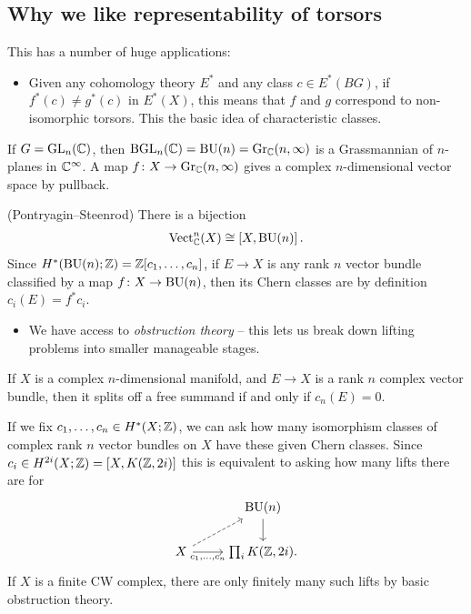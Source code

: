 \documentclass[11pt,openany]{book}
\begin{document}
\subsection{Why we like representability of torsors}





This has a number of huge applications:
\begin{itemize}
    \item Given any cohomology theory $E^\ast$ and any class $c\in E^\ast(BG)$, if $f^\ast(c) \ne g^\ast(c)$ in $E^\ast(X)$, this means that $f$ and $g$ correspond to non-isomorphic torsors. This the basic idea of characteristic classes.
\end{itemize}

\begin{example} If $G = \mathrm{GL}_n(\mathbb{C})$, then $\mathrm{BGL}_n(\mathbb{C}) = \mathrm{BU}(n) = \mathrm{Gr}_{\mathbb{C}}(n,\infty)$ is a Grassmannian of $n$-planes in $\mathbb{C}^\infty$. A map $f \colon X \to \mathrm{Gr}_{\mathbb{C}}(n,\infty)$ gives a complex $n$-dimensional vector space by pullback.
\end{example}

\begin{theorem} (Pontryagin--Steenrod) There is a bijection
\begin{align*}
    \mathrm{Vect}_{\mathbb{C}}^n(X) \cong \left[ X, \mathrm{BU}(n) \right].
\end{align*}
Since $H^\ast(\mathrm{BU}(n);\mathbb{Z}) = \mathbb{Z}[c_1, \ldots, c_n]$, if $E \to X$ is any rank $n$ vector bundle classified by a map $f \colon X \to \mathrm{BU}(n)$, then its Chern classes are by definition $c_i(E) = f^\ast c_i$.
\end{theorem}

\begin{itemize}
    \item We have access to \textit{obstruction theory} -- this lets us break down lifting problems into smaller manageable stages.
\end{itemize}

\begin{example} If $X$ is a complex $n$-dimensional manifold, and $E \to X$ is a rank $n$ complex vector bundle, then it splits off a free summand if and only if $c_n(E) = 0$.
\end{example}

\begin{example} If we fix $c_1, \ldots, c_n \in H^{\ast}(X;\mathbb{Z})$, we can ask how many isomorphism classes of complex rank $n$ vector bundles on $X$ have these given Chern classes. Since $c_i \in H^{2i}(X;\mathbb{Z}) = \left[ X, K(\mathbb{Z},2i) \right]$ this is equivalent to asking how many lifts there are for
\[ \begin{tikzcd}
     & \BU(n)\dar\\
    X\ar[ur,dashed]\rar["{c_1, \ldots, c_n}" below] & {\prod_i K(\Z,2i)}.
\end{tikzcd} \]
If $X$ is a finite CW complex, there are only finitely many such lifts by basic obstruction theory.
\end{example}
\end{document}
